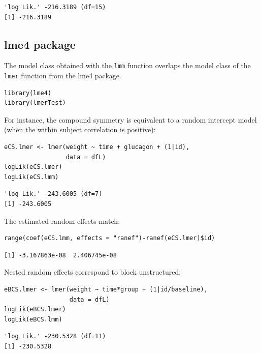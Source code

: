 \documentclass[12pt]{article}
\begin{document}
\begin{verbatim}
'log Lik.' -216.3189 (df=15)
[1] -216.3189
\end{verbatim}


\clearpage

\subsection{lme4 package}
\label{sec:org8ea2484}

The model class obtained with the \texttt{lmm} function overlaps the model
class of the \texttt{lmer} function from the lme4 package.
\lstset{language=r,label= ,caption= ,captionpos=b,numbers=none}
\begin{lstlisting}
library(lme4)
library(lmerTest)
\end{lstlisting}

For instance, the compound symmetry is equivalent to a random
intercept model (when the within subject correlation is positive):
\lstset{language=r,label= ,caption= ,captionpos=b,numbers=none}
\begin{lstlisting}
eCS.lmer <- lmer(weight ~ time + glucagon + (1|id),
                 data = dfL)
logLik(eCS.lmer)
logLik(eCS.lmm)
\end{lstlisting}

\begin{verbatim}
'log Lik.' -243.6005 (df=7)
[1] -243.6005
\end{verbatim}


The estimated random effects match:
\lstset{language=r,label= ,caption= ,captionpos=b,numbers=none}
\begin{lstlisting}
range(coef(eCS.lmm, effects = "ranef")-ranef(eCS.lmer)$id)
\end{lstlisting}

\begin{verbatim}
[1] -3.167863e-08  2.406745e-08
\end{verbatim}


Nested random effects correspond to block unstructured:
\lstset{language=r,label= ,caption= ,captionpos=b,numbers=none}
\begin{lstlisting}
eBCS.lmer <- lmer(weight ~ time*group + (1|id/baseline),
                  data = dfL)
logLik(eBCS.lmer)
logLik(eBCS.lmm)
\end{lstlisting}

\begin{verbatim}
'log Lik.' -230.5328 (df=11)
[1] -230.5328
\end{verbatim}
\end{document}
